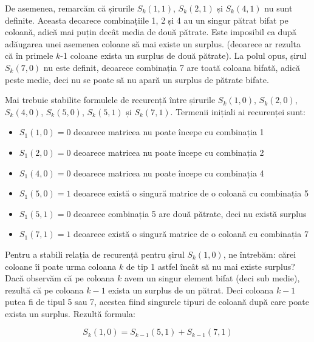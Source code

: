 De asemenea, remarcăm că șirurile $S_k(1,1)$, $S_k(2,1)$ și $S_k(4,1)$ nu sunt
definite. Aceasta deoarece combinațiile 1, 2 și 4 au un singur pătrat bifat pe
coloană, adică mai puțin decât media de două pătrate. Este imposibil ca după
adăugarea unei asemenea coloane să mai existe un surplus. (deoarece ar rezulta
că în primele $k$-1 coloane exista un surplus de două pătrate). La polul opus,
șirul $S_k(7,0)$ nu este definit, deoarece combinația 7 are toată coloana
bifată, adică peste medie, deci nu se poate să nu apară un surplus de pătrate
bifate.

Mai trebuie stabilite formulele de recurență între șirurile $S_k(1,0)$,
$S_k(2,0)$, $S_k(4,0)$, $S_k(5,0)$, $S_k(5,1)$ și $S_k(7,1)$. Termenii
inițiali ai recurenței sunt:

\begin{itemize}

\item $S_1(1,0)=0$ deoarece matricea nu poate începe cu combinația 1

\item $S_1(2,0)=0$ deoarece matricea nu poate începe cu combinația 2

\item $S_1(4,0)=0$ deoarece matricea nu poate începe cu combinația 4

\item $S_1(5,0)=1$ deoarece există o singură matrice de o coloană cu
  combinația 5

\item $S_1(5,1)=0$ deoarece combinația 5 are două pătrate, deci nu există
  surplus

\item $S_1(7,1)=1$ deoarece există o singură matrice de o coloană cu
  combinația 7

\end{itemize}

Pentru a stabili relația de recurență pentru șirul $S_k(1,0)$, ne întrebăm:
cărei coloane îi poate urma coloana $k$ de tip 1 astfel încât să nu mai existe
surplus? Dacă observăm că pe coloana $k$ avem un singur element bifat (deci
sub medie), rezultă că pe coloana $k-1$ exista un surplus de un pătrat. Deci
coloana $k-1$ putea fi de tipul 5 sau 7, acestea fiind singurele tipuri de
coloană după care poate exista un surplus. Rezultă formula:

\begin{equation}
  S_k(1,0)=S_{k-1}(5,1)+S_{k-1}(7,1)
\end{equation}

